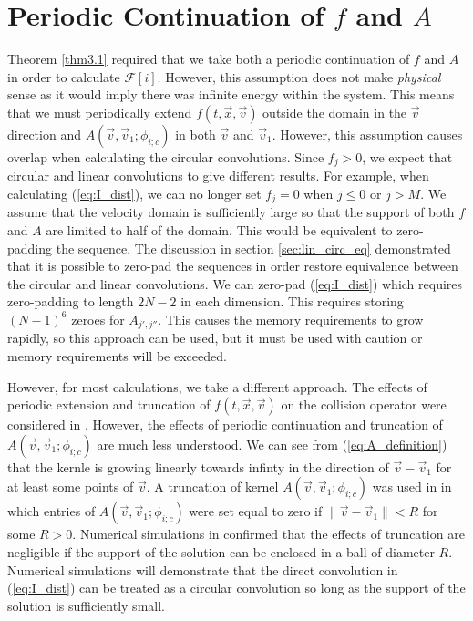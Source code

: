 \documentclass[12pt]{CSUNthesis}
\def\calF{\mathcal{F}}
\newcommand{\vecx}{\vec{x}}
\newcommand{\vecv}{\vec{v}}
\begin{document}
\section{Periodic Continuation of $f$ and $A$}
\label{sec:periodic_cont}
Theorem \ref{thm3.1} required that we take both a periodic continuation of $f$ and $A$ in order to calculate $\calF[i]$. 
However, this assumption does not make \textit{physical} sense as it would imply there was infinite energy within the system.
This means that we must periodically extend $f(t, \vecx, \vecv)$ outside the domain in the $\vecv$ direction and $A(\vecv, \vecv_1; \phi_{i;c})$ in both $\vecv$ and $\vecv_1$. 
However, this assumption causes overlap when calculating the circular convolutions. Since $f_{j} > 0$, we expect that circular and linear convolutions to give different results. For example, when calculating (\ref{eq:I_dist}), we can no longer set $f_j =0 $ when $j \leq 0$ or $j > M$. 
We assume that the velocity domain is sufficiently large so that the support of both $f$ and $A$ are limited to half of the domain. This would be equivalent to zero-padding the sequence.
 The discussion in section \ref{sec:lin_circ_eq} demonstrated that it is possible to zero-pad the sequences in order restore equivalence between the circular and linear convolutions. We can zero-pad (\ref{eq:I_dist}) which requires zero-padding to length $2N-2$ in each dimension. This requires storing $(N-1)^6$ zeroes for $A_{j',j''}$. This causes the memory requirements to grow rapidly, so this approach can be used, but it must be used with caution or memory requirements will be exceeded.


However, for most calculations, we take a different approach. The effects of periodic extension and truncation of $f(t,\vecx,\vecv)$ on the collision operator were considered in \cite{PareschiRusso2000}. However, the effects of periodic continuation and truncation of $A(\vecv, \vecv_1; \phi_{i;c})$ are much less understood. We can see from (\ref{eq:A_definition}) that the kernle is growing linearly towards infinty in the direction of $\vecv - \vecv_1$ for at least some points of $\vecv$. A truncation of kernel $A(\vecv, \vecv_1; \phi_{i;c})$ was used in \cite{AlekseenkoJosyula2012a} in which entries of $A(\vecv, \vecv_1; \phi_{i;c})$ were set equal to zero if $\|\vecv - \vecv_1\| < R$ for some $R>0$. Numerical simulations in \cite{AlekseenkoJosyula2012a} confirmed that the effects of truncation are negligible if the support of the solution can be enclosed in a ball of diameter $R$.
Numerical simulations will demonstrate that the direct convolution in (\ref{eq:I_dist})  can be treated as a circular convolution so long as the support of the solution is sufficiently small.
\end{document}

